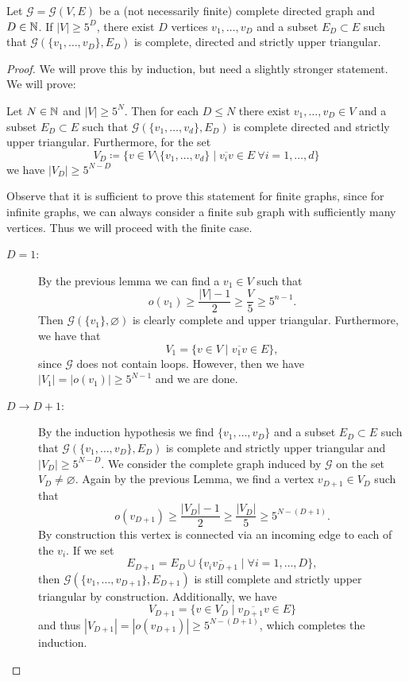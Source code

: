 \begin{lemma}[{\cite[Lemma~A.8]{MR3509968}}]
  \label{lem:A.8}
  Let \(\mathcal{G} = \mathcal{G}(V,E)\) be a (not necessarily finite) complete directed graph and \(D \in \mathbb{N}\). If \(|V| \geq 5^D\), there exist \(D\) vertices \(v_1, \dots, v_D\) and a subset \(E_D \subset E\) such that \(\mathcal{G}(\{v_1, \dots, v_D\}, E_D)\) is complete, directed and strictly upper triangular.
\end{lemma}

\begin{proof}
  We will prove this by induction, but need a slightly stronger statement. We will prove:

  Let \(N \in \mathbb{N}\) and \(|V| \geq 5^N\). Then for each \(D \leq N\) there exist \(v_1,\dots, v_D \in V\) and a subset \(E_D \subset E\) such that \(\mathcal{G}(\{v_1, \dots, v_d\}, E_D)\) is complete directed and strictly upper triangular. Furthermore, for the set
  \[
    V_D \coloneqq \{v \in V \setminus \{v_1, \dots, v_d\} \mid \overline{v_iv} \in E\ \forall i =1,\dots, d\}
  \]
  we have \(|V_D| \geq 5^{N-D}\)

  Observe that it is sufficient to prove this statement for finite graphs, since for infinite graphs, we can always consider a finite sub graph with sufficiently many vertices. Thus we will proceed with the finite case.
  \begin{description}
  \item[\(D = 1\):] By the previous lemma we can find a \(v_1 \in V\) such that
    \[
      o(v_1) \geq \frac{|V| - 1}{2} \geq \frac{V}{5} \geq 5^{n-1}.
    \]
    Then \(\mathcal{G}(\{v_1\}, \varnothing)\) is clearly complete and upper triangular. Furthermore, we have that
    \[
      V_1 = \{v \in V \mid \overline{v_1v} \in E\},
    \]
    since \(\mathcal{G}\) does not contain loops. However, then we have \(|V_1| = |o(v_1)| \geq 5^{N-1}\) and we are done.
  \item[\(D \to D+1\):] By the induction hypothesis we find \(\{v_1, \dots, v_D\}\) and a subset \(E_D \subset E\) such that \(\mathcal{G}(\{v_1, \dots, v_D\}, E_D)\) is complete and strictly upper triangular and \(|V_D| \geq 5^{N-D}\). We consider the complete graph induced by \(\mathcal{G}\) on the set \(V_D \neq \varnothing\). Again by the previous Lemma, we find a vertex \(v_{D+1} \in V_D\) such that
    \[
      o(v_{D+1}) \geq \frac{|V_D| -1}{2} \geq \frac{|V_D|}{5} \geq 5^{N - (D+1)}.
    \]
    By construction this vertex is connected via an incoming edge to each of the \(v_i\). If we set
    \[
      E_{D+1} = E_D \cup \{\overline{v_iv_{D+1}} \mid \forall i = 1, \dots, D\},
    \]
    then \(\mathcal{G}(\{v_1, \dots, v_{D+1}\}, E_{D+1})\) is still complete and strictly upper triangular by construction. Additionally, we have
    \[
      V_{D+1} = \{v \in V_D \mid \overline{v_{D+1}v} \in E\}
    \]
    and thus \(|V_{D+1}| = |o(v_{D+1})| \geq 5^{N- (D+1)}\), which completes the induction.
  \end{description}
\end{proof}

